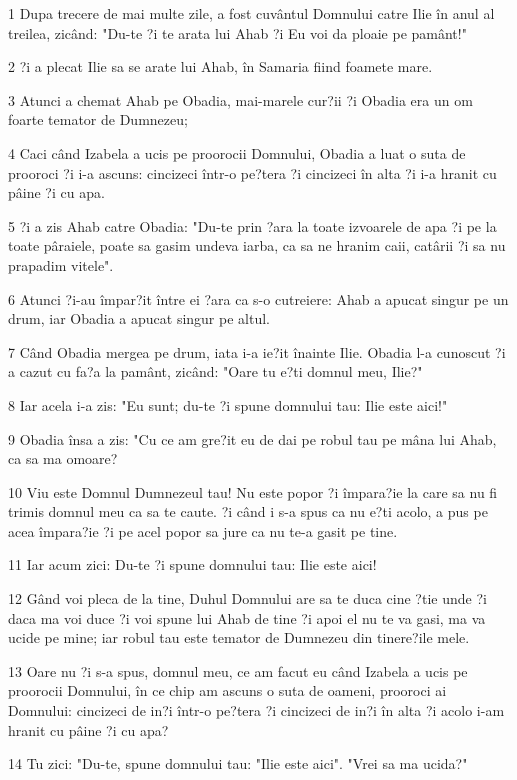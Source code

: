 \par 1 Dupa trecere de mai multe zile, a fost cuvântul Domnului catre Ilie în anul al treilea, zicând: "Du-te ?i te arata lui Ahab ?i Eu voi da ploaie pe pamânt!"
\par 2 ?i a plecat Ilie sa se arate lui Ahab, în Samaria fiind foamete mare.
\par 3 Atunci a chemat Ahab pe Obadia, mai-marele cur?ii ?i Obadia era un om foarte temator de Dumnezeu;
\par 4 Caci când Izabela a ucis pe proorocii Domnului, Obadia a luat o suta de prooroci ?i i-a ascuns: cincizeci într-o pe?tera ?i cincizeci în alta ?i i-a hranit cu pâine ?i cu apa.
\par 5 ?i a zis Ahab catre Obadia: "Du-te prin ?ara la toate izvoarele de apa ?i pe la toate pâraiele, poate sa gasim undeva iarba, ca sa ne hranim caii, catârii ?i sa nu prapadim vitele".
\par 6 Atunci ?i-au împar?it între ei ?ara ca s-o cutreiere: Ahab a apucat singur pe un drum, iar Obadia a apucat singur pe altul.
\par 7 Când Obadia mergea pe drum, iata i-a ie?it înainte Ilie. Obadia l-a cunoscut ?i a cazut cu fa?a la pamânt, zicând: "Oare tu e?ti domnul meu, Ilie?"
\par 8 Iar acela i-a zis: "Eu sunt; du-te ?i spune domnului tau: Ilie este aici!"
\par 9 Obadia însa a zis: "Cu ce am gre?it eu de dai pe robul tau pe mâna lui Ahab, ca sa ma omoare?
\par 10 Viu este Domnul Dumnezeul tau! Nu este popor ?i împara?ie la care sa nu fi trimis domnul meu ca sa te caute. ?i când i s-a spus ca nu e?ti acolo, a pus pe acea împara?ie ?i pe acel popor sa jure ca nu te-a gasit pe tine.
\par 11 Iar acum zici: Du-te ?i spune domnului tau: Ilie este aici!
\par 12 Gând voi pleca de la tine, Duhul Domnului are sa te duca cine ?tie unde ?i daca ma voi duce ?i voi spune lui Ahab de tine ?i apoi el nu te va gasi, ma va ucide pe mine; iar robul tau este temator de Dumnezeu din tinere?ile mele.
\par 13 Oare nu ?i s-a spus, domnul meu, ce am facut eu când Izabela a ucis pe proorocii Domnului, în ce chip am ascuns o suta de oameni, prooroci ai Domnului: cincizeci de in?i într-o pe?tera ?i cincizeci de in?i în alta ?i acolo i-am hranit cu pâine ?i cu apa?
\par 14 Tu zici: "Du-te, spune domnului tau: "Ilie este aici". "Vrei sa ma ucida?"
